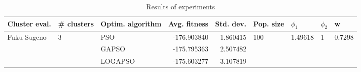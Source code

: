 \begin{table}
\centering
\caption{Results of experiments}
\begin{tabular}{lllrrllll}
\toprule
               Cluster eval. &        \# clusters & Optim. algorithm &  Avg. fitness &  Std. dev. &            Pop. size &               $\phi_{1}$ &         $\phi_{2}$ &                       w \\
\midrule
\multirow{3}{*}{Fuku Sugeno} & \multirow{3}{*}{3} &              PSO &   -176.903840 &   1.860415 & \multirow{3}{*}{100} & \multirow{3}{*}{1.49618} & \multirow{3}{*}{1} & \multirow{3}{*}{0.7298} \\
                             &                    &            GAPSO &   -175.795363 &   2.507482 &                      &                          &                    &                         \\
                             &                    &          LOGAPSO &   -175.603277 &   3.107819 &                      &                          &                    &                         \\
\bottomrule
\end{tabular}
\end{table}
